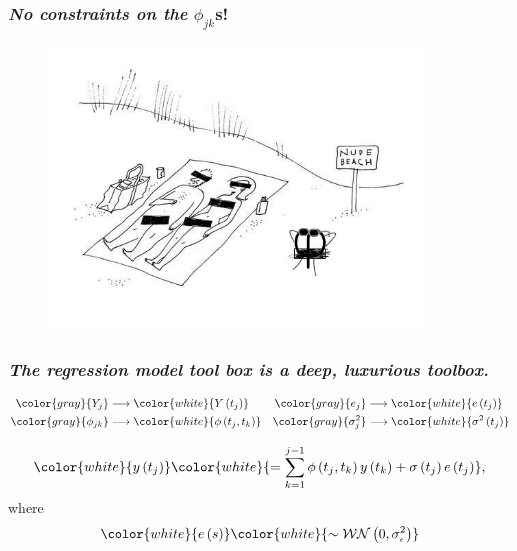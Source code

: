 \documentclass[12pt]{beamer}
\newcommand{\makegrey}[1]{{ \color{gray} {#1}}}
\newcommand{\makewhite}[1]{{ \color{white} {#1}}}
\newcommand{\ms}{\scriptscriptstyle}
\newcommand\myfootnote[1]{%
  \begingroup
  \renewcommand\thefootnote{}\footnote{#1}%
  \addtocounter{footnote}{-1}%
  \endgroup
}
\begin{document}
\begin{frame}
\frametitle{\emph{No constraints on the} $\phi_{jk}$s!}

\begin{adjustwidth}{-3cm}{-3cm}
\begin{center}
\begin{figure}
\graphicspath{{img/}}
  \includegraphics[height=7.5cm]{nude-beach}
\end{figure}
\end{center}
  \end{adjustwidth}
\end{frame}





\begin{frame}
\frametitle{\emph{The regression model tool box is a deep, luxurious toolbox.}}

\begin{align*}
\makegrey{Y_j}  	&\longrightarrow \makewhite{Y\left( t_j \right) }		&	 \makegrey{e_j} 		&\longrightarrow \makewhite{e\left( t_j \right)}\\
\makegrey{\phi_{jk}} &\longrightarrow \makewhite{\phi\left(t_j,t_k\right)} 	& 	\makegrey{\sigma^2_{j}} &\longrightarrow \makewhite{\sigma^2\left(t_j\right)}
\end{align*}
\noindent


\begin{equation}  \label{eq:MyModel}  
\makewhite{y\left(t_j \right)}  \makewhite{= \sum_{k=1}^{j-1} \phi\left(t_j ,t_k\right) y\left(t_k\right) + \sigma\left(t_j\right)e\left({t_j}\right)},
\end{equation}
\noindent
where
\begin{equation*} 
\makewhite{e\left(s\right)} \makewhite{ \sim  \mathcal{WN}\left(0,\sigma_{\ms e}^2 \right)}
\end{equation*}


\end{frame}
\end{document}
